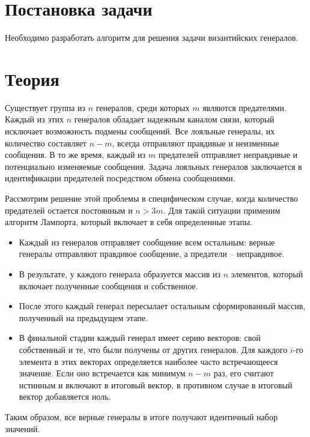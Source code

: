 \documentclass[a4paper,12pt]{article}
\begin{document}
    
    \newpage

    \tableofcontents
    \newpage

    \section{Постановка задачи}
    \quad Необходимо разработать алгоритм для решения задачи византийских генералов.

    \section{Теория}
    \quad Существует группа из $ n $ генералов, среди которых $ m $ являются предателями. Каждый из этих $ n $ генералов обладает надежным каналом связи, который исключает возможность подмены сообщений. Все лояльные генералы, их количество составляет $ n - m $, всегда отправляют правдивые и неизменные сообщения. В то же время, каждый из $ m $ предателей отправляет неправдивые и потенциально изменяемые сообщения. Задача лояльных генералов заключается в идентификации предателей посредством обмена сообщениями.

    Рассмотрим решение этой проблемы в специфическом случае, когда количество предателей остается постоянным и $ n > 3m $.
    Для такой ситуации применим алгоритм Лампорта, который включает в себя определенные этапы.
    \begin{itemize}
        \item Каждый из генералов отправляет сообщение всем остальным: верные генералы отправляют правдивое сообщение, а предатели – неправдивое.
        \item В результате, у каждого генерала образуется массив из $ n $ элементов, который включает полученные сообщения и собственное.
        \item После этого каждый генерал пересылает остальным сформированный массив, полученный на предыдущем этапе.
        \item В финальной стадии каждый генерал имеет серию векторов: свой собственный и те, что были получены от других генералов. Для каждого $ i $-го элемента в этих векторах определяется наиболее часто встречающееся значение. Если оно встречается как минимум $ n - m $ раз, его считают истинным и включают в итоговый вектор, в противном случае в итоговый вектор добавляется ноль.
    \end{itemize}

    Таким образом, все верные генералы в итоге получают идентичный набор значений.
\end{document}
